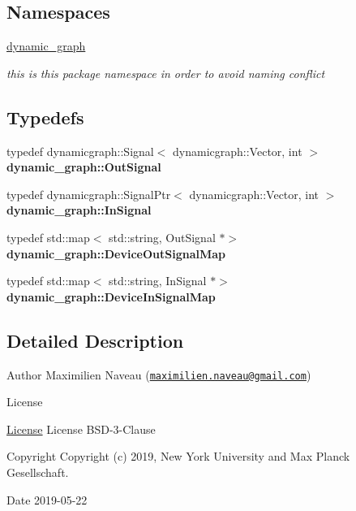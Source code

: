 \subsection*{Namespaces}
\begin{DoxyCompactItemize}
\item 
 \hyperlink{namespacedynamic__graph}{dynamic\+\_\+graph}
\begin{DoxyCompactList}\small\item\em this is this package namespace in order to avoid naming conflict \end{DoxyCompactList}\end{DoxyCompactItemize}
\subsection*{Typedefs}
\begin{DoxyCompactItemize}
\item 
\mbox{\label{namespacedynamic__graph_a6c34573645d04590fd934e56f3d1b16b}} 
typedef dynamicgraph\+::\+Signal$<$ dynamicgraph\+::\+Vector, int $>$ {\bfseries dynamic\+\_\+graph\+::\+Out\+Signal}
\item 
\mbox{\label{namespacedynamic__graph_a5a0e93b7f753ed4c9869e83a04c30d74}} 
typedef dynamicgraph\+::\+Signal\+Ptr$<$ dynamicgraph\+::\+Vector, int $>$ {\bfseries dynamic\+\_\+graph\+::\+In\+Signal}
\item 
\mbox{\label{namespacedynamic__graph_a4769898c82f6e8bef38422819cca0481}} 
typedef std\+::map$<$ std\+::string, Out\+Signal $\ast$$>$ {\bfseries dynamic\+\_\+graph\+::\+Device\+Out\+Signal\+Map}
\item 
\mbox{\label{namespacedynamic__graph_a7deb814159c6992434f2660870726c73}} 
typedef std\+::map$<$ std\+::string, In\+Signal $\ast$$>$ {\bfseries dynamic\+\_\+graph\+::\+Device\+In\+Signal\+Map}
\end{DoxyCompactItemize}


\subsection{Detailed Description}
\begin{DoxyAuthor}{Author}
Maximilien Naveau (\href{mailto:maximilien.naveau@gmail.com}{\tt maximilien.\+naveau@gmail.\+com}) 
\end{DoxyAuthor}
\begin{DoxyRefDesc}{License}
\item[\hyperlink{license__license000003}{License}]License B\+S\+D-\/3-\/\+Clause \end{DoxyRefDesc}
\begin{DoxyCopyright}{Copyright}
Copyright (c) 2019, New York University and Max Planck Gesellschaft. 
\end{DoxyCopyright}
\begin{DoxyDate}{Date}
2019-\/05-\/22 
\end{DoxyDate}

